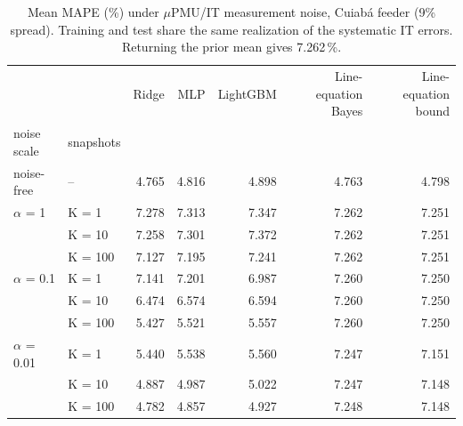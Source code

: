 \begin{table}[htbp]
\centering
\small
\caption{Mean MAPE (\%) under $\mu$PMU/IT measurement noise, Cuiabá feeder (9\% spread). Training and test share the same realization of the systematic IT errors. Returning the prior mean gives 7.262\,\%.}
\label{tab:e3_cuiaba09}
\begin{tabular}{llrrrrr}
\toprule
 &  & Ridge & MLP & LightGBM & Line-equation Bayes & Line-equation bound \\
noise scale & snapshots &  &  &  &  &  \\
\midrule
noise-free & -- & 4.765 & 4.816 & 4.898 & 4.763 & 4.798 \\
\midrule
$\alpha$ = 1 & K = 1 & 7.278 & 7.313 & 7.347 & 7.262 & 7.251 \\
 & K = 10 & 7.258 & 7.301 & 7.372 & 7.262 & 7.251 \\
 & K = 100 & 7.127 & 7.195 & 7.241 & 7.262 & 7.251 \\
\midrule
$\alpha$ = 0.1 & K = 1 & 7.141 & 7.201 & 6.987 & 7.260 & 7.250 \\
 & K = 10 & 6.474 & 6.574 & 6.594 & 7.260 & 7.250 \\
 & K = 100 & 5.427 & 5.521 & 5.557 & 7.260 & 7.250 \\
\midrule
$\alpha$ = 0.01 & K = 1 & 5.440 & 5.538 & 5.560 & 7.247 & 7.151 \\
 & K = 10 & 4.887 & 4.987 & 5.022 & 7.247 & 7.148 \\
 & K = 100 & 4.782 & 4.857 & 4.927 & 7.248 & 7.148 \\
\bottomrule
\end{tabular}
\end{table}
